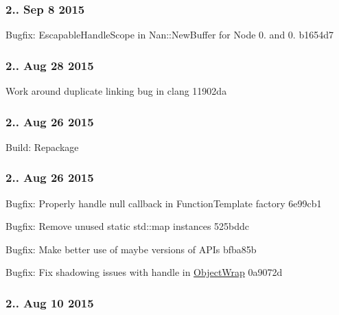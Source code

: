 \subsubsection*{2.. Sep 8 2015}


\begin{DoxyItemize}
\item Bugfix\+: Escapable\+Handle\+Scope in Nan\+::\+New\+Buffer for Node 0. and 0. b1654d7
\end{DoxyItemize}

\subsubsection*{2.. Aug 28 2015}


\begin{DoxyItemize}
\item Work around duplicate linking bug in clang 11902da
\end{DoxyItemize}

\subsubsection*{2.. Aug 26 2015}


\begin{DoxyItemize}
\item Build\+: Repackage
\end{DoxyItemize}

\subsubsection*{2.. Aug 26 2015}


\begin{DoxyItemize}
\item Bugfix\+: Properly handle null callback in Function\+Template factory 6e99cb1
\item Bugfix\+: Remove unused static std\+::map instances 525bddc
\item Bugfix\+: Make better use of maybe versions of A\+P\+Is bfba85b
\item Bugfix\+: Fix shadowing issues with handle in \hyperlink{class_object_wrap}{Object\+Wrap} 0a9072d
\end{DoxyItemize}

\subsubsection*{2.. Aug 10 2015}



